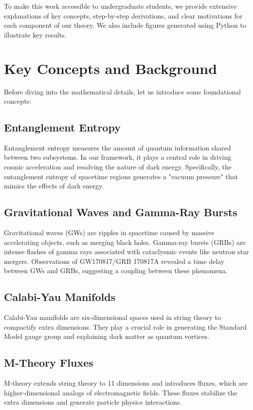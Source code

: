 \documentclass[12pt, a4paper]{article}
\begin{document}
To make this work accessible to undergraduate students, we provide extensive explanations of key concepts, step-by-step derivations, and clear motivations for each component of our theory. We also include figures generated using Python to illustrate key results.

\section{Key Concepts and Background}
Before diving into the mathematical details, let us introduce some foundational concepts:

\subsection{Entanglement Entropy}
Entanglement entropy measures the amount of quantum information shared between two subsystems. In our framework, it plays a central role in driving cosmic acceleration and resolving the nature of dark energy. Specifically, the entanglement entropy of spacetime regions generates a "vacuum pressure" that mimics the effects of dark energy.

\subsection{Gravitational Waves and Gamma-Ray Bursts}
Gravitational waves (GWs) are ripples in spacetime caused by massive accelerating objects, such as merging black holes. Gamma-ray bursts (GRBs) are intense flashes of gamma rays associated with cataclysmic events like neutron star mergers. Observations of GW170817/GRB 170817A revealed a time delay between GWs and GRBs, suggesting a coupling between these phenomena.

\subsection{Calabi-Yau Manifolds}
Calabi-Yau manifolds are six-dimensional spaces used in string theory to compactify extra dimensions. They play a crucial role in generating the Standard Model gauge group and explaining dark matter as quantum vortices.

\subsection{M-Theory Fluxes}
M-theory extends string theory to 11 dimensions and introduces fluxes, which are higher-dimensional analogs of electromagnetic fields. These fluxes stabilize the extra dimensions and generate particle physics interactions.
\end{document}

